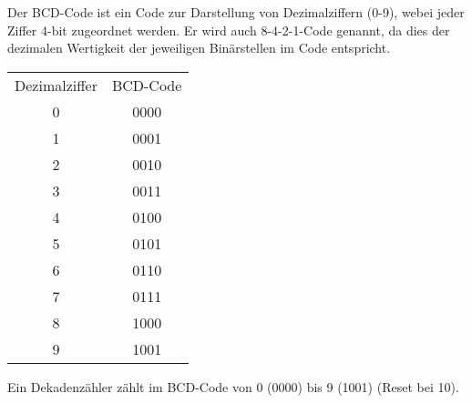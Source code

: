 Der BCD-Code ist ein Code zur Darstellung von Dezimalziffern (0-9), webei jeder
Ziffer 4-bit zugeordnet werden. Er wird auch 8-4-2-1-Code genannt, da dies der
dezimalen Wertigkeit der jeweiligen Binärstellen im Code entspricht.

\begin{table}[H]
  \begin{center}
\begin{tabular}{cc}
\rowcolor{gray0} 
Dezimalziffer & BCD-Code \\
0             & 0000     \\
1             & 0001     \\
2             & 0010     \\
3             & 0011     \\
4             & 0100     \\
5             & 0101     \\
6             & 0110     \\
7             & 0111     \\
8             & 1000     \\
9             & 1001    
\end{tabular}
\end{center}
\end{table}

Ein Dekadenzähler zählt im BCD-Code von 0 (0000) bis 9 (1001) (Reset bei 10).